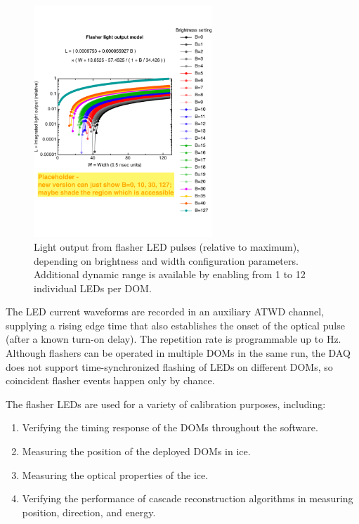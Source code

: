 \begin{figure}[h]
 \centering
 \includegraphics[width=0.6\textwidth]{graphics/dom/functional/domfig5-BrightnessModel.pdf}
 \caption{Light output from flasher LED pulses (relative to maximum), depending
on brightness and width configuration parameters.  Additional dynamic range is available
by enabling from 1 to 12 individual LEDs per DOM.}
 \label{fig:flasheroutput}
\end{figure}

The LED current waveforms are recorded in an auxiliary ATWD channel, supplying
a rising edge time that also establishes the onset of the optical pulse (after a known
turn-on delay).
The repetition rate is programmable up to \unit[610]{Hz}.
Although flashers can be
operated in multiple DOMs in the same run, the DAQ does not support
time-synchronized flashing of LEDs on different DOMs, so coincident flasher
events happen only by chance. 

The flasher LEDs are used for a variety of calibration purposes, including:
\begin{enumerate}
\item Verifying the timing response of the DOMs throughout the
  software.
\item Measuring the position of the deployed DOMs in ice.
\item Measuring the optical properties of the ice.
\item Verifying the performance of cascade reconstruction algorithms
  in measuring position, direction, and energy.
\end{enumerate}

